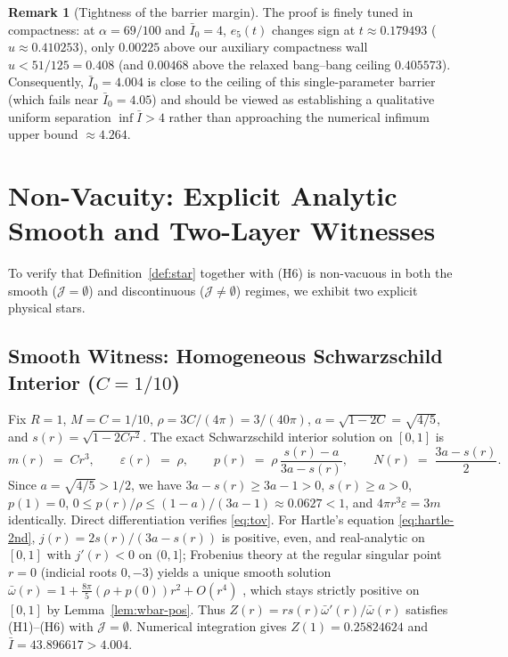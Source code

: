 \documentclass[11pt]{article}
\theoremstyle{plain}
\theoremstyle{definition}
\newtheorem{remark}[theorem]{Remark}
\newcommand{\eps}{\varepsilon}
\newcommand{\Ibar}{\bar{I}}
\newcommand{\wbar}{\bar{\omega}}
\begin{document}
\begin{remark}[Tightness of the barrier margin]
The proof is finely tuned in compactness: at $\alpha = 69/100$ and $\Ibar_0 = 4$, $e_5(t)$ changes sign at $t \approx 0.179493$ ($u \approx 0.410253$), only $0.00225$ above our auxiliary compactness wall $u < 51/125 = 0.408$ (and $0.00468$ above the relaxed bang--bang ceiling $0.405573$). Consequently, $\Ibar_0 = 4.004$ is close to the ceiling of this single-parameter barrier (which fails near $\Ibar_0 = 4.05$) and should be viewed as establishing a qualitative uniform separation $\inf \Ibar > 4$ rather than approaching the numerical infimum upper bound $\approx 4.264$.
\end{remark}

\section{Non-Vacuity: Explicit Analytic Smooth and Two-Layer Witnesses}
\label{sec:nonvacuity}

To verify that Definition~\ref{def:star} together with (H6) is non-vacuous in both the smooth ($\mathcal{J} = \emptyset$) and discontinuous ($\mathcal{J} \neq \emptyset$) regimes, we exhibit two explicit physical stars.

\subsection{Smooth Witness: Homogeneous Schwarzschild Interior (\texorpdfstring{$C = 1/10$}{C = 1/10})}

Fix $R = 1$, $M = C = 1/10$, $\rho = 3C/(4\pi) = 3/(40\pi)$, $a = \sqrt{1 - 2C} = \sqrt{4/5}$, and $s(r) = \sqrt{1 - 2 C r^2}$. The exact Schwarzschild interior solution on $[0, 1]$ is
\begin{equation}
  m(r) \;=\; C r^3, \qquad \eps(r) \;=\; \rho, \qquad
  p(r) \;=\; \rho\,\frac{s(r) - a}{3a - s(r)}, \qquad
  N(r) \;=\; \frac{3a - s(r)}{2}.
  \label{eq:schw-interior}
\end{equation}
Since $a = \sqrt{4/5} > 1/2$, we have $3a - s(r) \ge 3a - 1 > 0$, $s(r) \ge a > 0$, $p(1) = 0$, $0 \le p(r)/\rho \le (1 - a)/(3a - 1) \approx 0.0627 < 1$, and $4\pi r^3 \eps = 3 m$ identically. Direct differentiation verifies \eqref{eq:tov}. For Hartle's equation \eqref{eq:hartle-2nd}, $j(r) = 2 s(r)/(3a - s(r))$ is positive, even, and real-analytic on $[0, 1]$ with $j'(r) < 0$ on $(0, 1]$; Frobenius theory at the regular singular point $r=0$ (indicial roots $0, -3$) yields a unique smooth solution $\wbar(r) = 1 + \frac{8\pi}{5}(\rho + p(0)) r^2 + O(r^4)$ \cite{Petroff2007}, which stays strictly positive on $[0, 1]$ by Lemma~\ref{lem:wbar-pos}. Thus $Z(r) = r s(r)\wbar'(r)/\wbar(r)$ satisfies (H1)--(H6) with $\mathcal{J} = \emptyset$. Numerical integration gives $Z(1) = 0.25824624$ and $\Ibar = 43.896617 > 4.004$.
\end{document}
